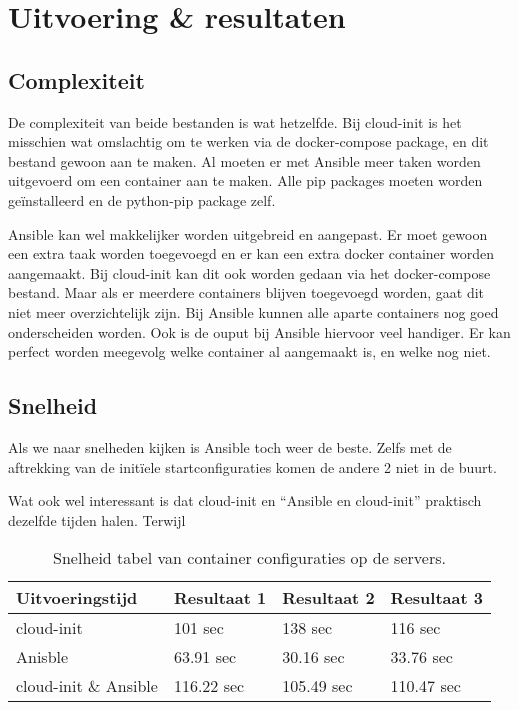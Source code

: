 \section{Uitvoering \& resultaten}
\subsection{Complexiteit}
De complexiteit van beide bestanden is wat hetzelfde. Bij cloud-init is het misschien wat omslachtig om te werken via de docker-compose package, en dit bestand gewoon aan te maken. Al moeten er met Ansible meer taken worden uitgevoerd om een container aan te maken. Alle pip packages moeten worden geïnstalleerd en de python-pip package zelf. 

Ansible kan wel makkelijker worden uitgebreid en aangepast. Er moet gewoon een extra taak worden toegevoegd en er kan een extra docker container worden aangemaakt. Bij cloud-init kan dit ook worden gedaan via het docker-compose bestand. Maar als er meerdere containers blijven toegevoegd worden, gaat dit niet meer overzichtelijk zijn. Bij Ansible kunnen alle aparte containers nog goed onderscheiden worden. Ook is de ouput bij Ansible hiervoor veel handiger. Er kan perfect worden meegevolg welke container al aangemaakt is, en welke nog niet.

\subsection{Snelheid}
Als we naar snelheden kijken is Ansible toch weer de beste. Zelfs met de aftrekking van de initïele startconfiguraties komen de andere 2 niet in de buurt.

Wat ook wel interessant is dat cloud-init en ``Ansible en cloud-init'' praktisch dezelfde tijden halen. Terwijl
\begin{table}[!htb]
	\centering
	\begin{tabular}{| l | l | l |l |}
        \hline
        \textbf{Uitvoeringstijd} & Resultaat 1 & Resultaat 2 & Resultaat 3   \\ \hline
        cloud-init & 101 sec & 138 sec & 116 sec  \\ \hline
        Anisble & 63.91 sec & 30.16 sec & 33.76 sec \\ \hline
        cloud-init \& Ansible & 116.22 sec & 105.49 sec & 110.47 sec \\
        \hline
    \end{tabular}
	\caption{Snelheid tabel van container configuraties op de servers.}
	\label{tab:tabel resultaten container}
\end{table}

